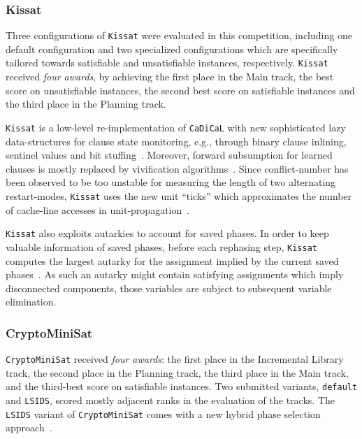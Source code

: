 \documentclass{elsarticle}
\newcommand{\solver}[1]{\texttt{#1}}
\begin{document}
\subsubsection{Kissat} 
\label{sec:kissat}

Three configurations of \solver{Kissat} were evaluated in this competition, including one default configuration and two specialized configurations which are specifically tailored towards satisfiable and unsatisfiable instances, respectively. 
\solver{Kissat} received \emph{four awards}, by achieving the first place in the Main track, 
the best score on unsatisfiable instances, the second best score on satisfiable instances and the third place in the Planning track. 

\solver{Kissat} is a low-level re-implementation of \solver{CaDiCaL} with new sophisticated lazy data-structures for clause state monitoring, e.g., through binary clause inlining, sentinel values and bit stuffing~\cite{Biere:SC2019,Biere:SC2020}. 
Moreover, forward subsumption for learned clauses is mostly replaced by vivification algorithms~\cite{ChuMinLi:2020:Vivification}. 
Since conflict-number has been observed to be too unstable for measuring the length of two alternating restart-modes, \solver{Kissat} uses the new unit ``ticks'' which approximates the number of cache-line accesses in unit-propagation~\cite{Biere:SC2020}. 

\solver{Kissat} also exploits autarkies to account for saved phases. 
In order to keep valuable information of saved phases, before each rephasing step, \solver{Kissat} computes the largest autarky for the assignment implied by the current saved phases~\cite{Kiesl:2019:Autarkies}. 
As such an autarky might contain satisfying assignments which imply disconnected components, those variables are subject to subsequent variable elimination. 


\subsubsection{CryptoMiniSat}
\label{sec:cryptominisat}

\solver{CryptoMiniSat} received \emph{four awards}: the first place in the Incremental Library track,
the second place in the Planning track, the third place in the Main track, and the third-best score on satisfiable instances. 
Two submitted variants, \solver{default} and \solver{LSIDS}, scored mostly adjacent ranks in the evaluation of the tracks. 
The \solver{LSIDS} variant of \solver{CryptoMiniSat} comes with a new hybrid phase selection approach~\cite{Shaw:2020:LSIDS,Soos:SC2020}.
\end{document}
